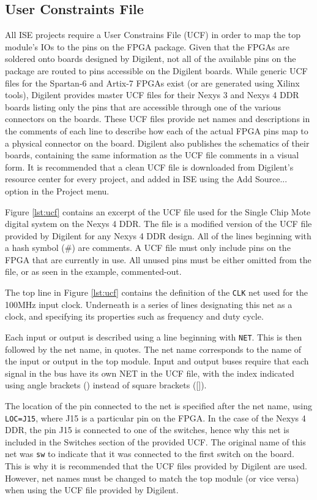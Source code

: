 \subsection{User Constraints File}
All ISE projects require a User Constrains File (UCF) in order to map the top module's IOs to the pins on the FPGA package. Given that the FPGAs are soldered onto boards designed by Digilent, not all of the available pins on the package are routed to pins accessible on the Digilent boards. While generic UCF files for the Spartan-6 and Artix-7 FPGAs exist (or are generated using Xilinx tools), Digilent provides master UCF files for their Nexys 3 and Nexys 4 DDR boards listing only the pins that are accessible through one of the various connectors on the boards. These UCF files provide net names and descriptions in the comments of each line to describe how each of the actual FPGA pins map to a physical connector on the board. Digilent also publishes the schematics of their boards, containing the same information as the UCF file comments in a visual form. It is recommended that a clean UCF file is downloaded from Digilent's resource center for every project, and added in ISE using the Add Source... option in the Project menu.

Figure \ref{lst:ucf} contains an excerpt of the UCF file used for the Single Chip Mote digital system on the Nexys 4 DDR. The file is a modified version of the UCF file provided by Digilent for any Nexys 4 DDR design. All of the lines beginning with a hash symbol (\#) are comments. A UCF file must only include pins on the FPGA that are currently in use. All unused pins must be either omitted from the file, or as seen in the example, commented-out.

The top line in Figure \ref{lst:ucf} contains the definition of the \texttt{CLK} net used for the 100MHz input clock. Underneath is a series of lines designating this net as a clock, and specifying its properties such as frequency and duty cycle.

Each input or output is described using a line beginning with \texttt{NET}. This is then followed by the net name, in quotes. The net name corresponds to the name of the input or output in the top module. Input and output buses require that each signal in the bus have its own NET in the UCF file, with the index indicated using angle brackets (\textlangle\textrangle) instead of square brackets ([]).

The location of the pin connected to the net is specified after the net name, using \texttt{LOC=J15}, where J15 is a particular pin on the FPGA. In the case of the Nexys 4 DDR, the pin J15 is connected to one of the switches, hence why this net is included in the Switches section of the provided UCF. The original name of this net was \texttt{sw\textrangle} to indicate that it was connected to the first switch on the board. This is why it is recommended that the UCF files provided by Digilent are used. However, net names must be changed to match the top module (or vice versa) when using the UCF file provided by Digilent.

